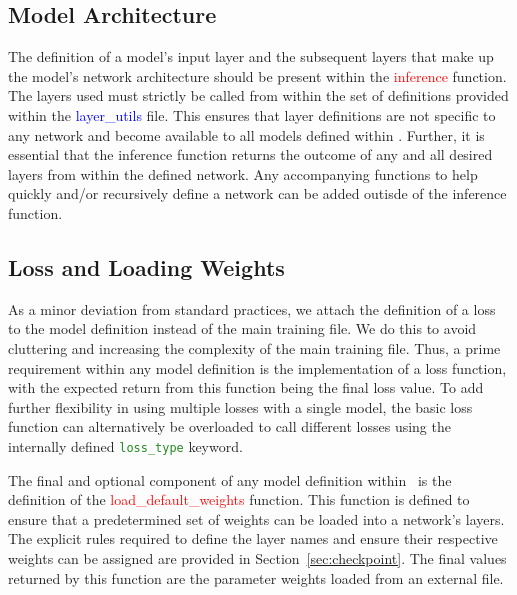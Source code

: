 \documentclass{llncs}
\begin{document}
\subsection{Model Architecture}
The definition of a model's input layer and the subsequent layers that make up the model's network architecture should be present within the \textcolor{red}{inference} function.
The layers used must strictly be called from within the set of definitions provided within the \textcolor{blue}{layer\_utils} file.
This ensures that layer definitions are not specific to any network and become available to all models defined within \acro.
Further, it is essential that the inference function returns the outcome of any and all desired layers from within the defined network.
Any accompanying functions to help quickly and/or recursively define a network can be added outisde of the inference function.


\subsection{Loss and Loading Weights}
As a minor deviation from standard practices, we attach the definition of a loss to the model definition instead of the main training file.
We do this to avoid cluttering and increasing the complexity of the main training file.
Thus, a prime requirement within any model definition is the implementation of a loss function, with the expected return from this function being the final loss value.
To add further flexibility in using multiple losses with a single model, the basic loss function can alternatively be overloaded to call different losses using the internally defined \texttt{\textcolor{ForestGreen}{loss\_type}} keyword.

The final and optional component of any model definition within \acro~is the definition of the \textcolor{red}{load\_default\_weights} function.
This function is defined to ensure that a predetermined set of weights can be loaded into a network's layers.
The explicit rules required to define the layer names and ensure their respective weights can be assigned are provided in Section~\ref{sec:checkpoint}.
The final values returned by this function are the parameter weights loaded from an external file.
\end{document}
